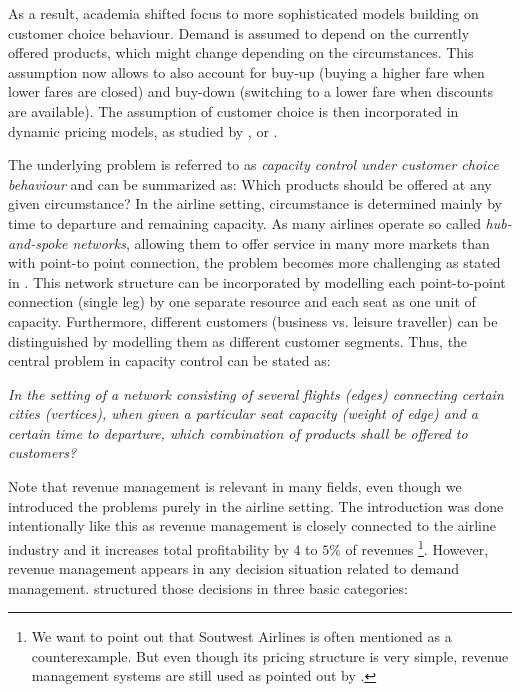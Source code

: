As a result, academia shifted focus to more sophisticated models building on customer choice behaviour. Demand is assumed to depend on the currently offered products, which might change depending on the circumstances. This assumption now allows to also account for buy-up (buying a higher fare when lower fares are closed) and buy-down (switching to a lower fare when discounts are available). The assumption of customer choice is then incorporated in dynamic pricing models, as \eg studied by \cite{Gallego.1997}, \cite{Bitran.1998} or \cite{Feng.2000}.

The underlying problem is referred to as \emph{capacity control under customer choice behaviour} and can be summarized as: Which products should be offered at any given circumstance? In the airline setting, circumstance is determined mainly by time to departure and remaining capacity. As many airlines operate so called \emph{hub-and-spoke networks}, allowing them to offer service in many more markets than with point-to point connection, the problem becomes more challenging as stated \eg in \cite{Talluri.2005}. This network structure can be incorporated by modelling each point-to-point connection (single leg) by one separate resource and each seat as one unit of capacity. Furthermore, different customers (\eg business vs. leisure traveller) can be distinguished by modelling them as different customer segments. Thus, the central problem in capacity control can be stated as:

\begin{center}
	\emph{In the setting of a network consisting of several flights (edges) connecting certain cities (vertices), when given a particular seat capacity (weight of edge) and a certain time to departure, which combination of products shall be offered to customers?}
\end{center} 

Note that revenue management is relevant in many fields, even though we introduced the problems purely in the airline setting. The introduction was done intentionally like this as revenue management is closely connected to the airline industry and it increases total profitability by $4$ to $5 \%$ of revenues \cite{Talluri.2005}\footnote{We want to point out that Soutwest Airlines is often mentioned as a counterexample. But even though its pricing structure is very simple, revenue management systems are still used as pointed out by \cite{Talluri.2005}.}. However, revenue management appears in any decision situation related to demand management. \cite{Talluri.2005} structured those decisions in three basic categories:

